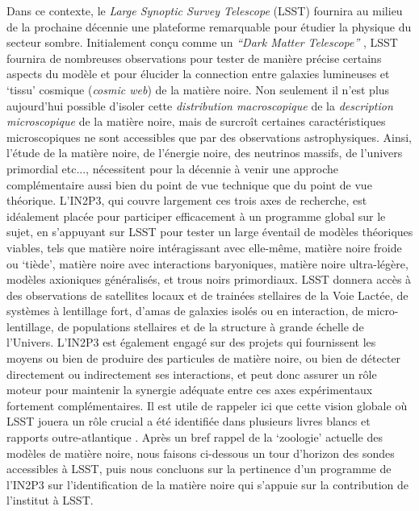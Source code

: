 \documentclass[12pt]{article}
\begin{document}
Dans ce contexte, le {\it Large Synoptic Survey Telescope} (LSST) fournira au milieu de la prochaine décennie une plateforme remarquable pour étudier la physique du secteur sombre. Initialement conçu comme un {\it ``Dark Matter Telescope''} \citep{Tyson:2001}, LSST fournira de nombreuses observations pour tester de manière précise certains aspects du modèle \LCDM et pour élucider la connection entre galaxies lumineuses et `tissu' cosmique ({\it cosmic web}) de la matière noire. Non seulement il n'est plus aujourd'hui possible d'isoler cette \emph{distribution macroscopique} de la \emph{description microscopique} de la matière noire, mais de surcroît certaines caractéristiques microscopiques ne sont accessibles que par des observations astrophysiques. 
Ainsi, l'étude de la matière noire, de l'énergie noire, des neutrinos massifs, de l'univers primordial etc..., nécessitent pour la décennie à venir une approche complémentaire aussi bien du point de vue technique que du point de vue théorique. L'IN2P3, qui couvre largement ces trois axes de recherche, est idéalement placée pour participer efficacement à un programme global sur le sujet, en s'appuyant sur LSST pour tester un large éventail de modèles théoriques viables, tels que matière noire intéragissant avec elle-même, matière noire froide ou `tiède', matière noire avec interactions baryoniques, matière noire ultra-légère, modèles axioniques généralisés, et trous noirs primordiaux. LSST donnera accès à des observations de satellites locaux et de trainées stellaires de la Voie Lactée, de systèmes à lentillage fort, d'amas de galaxies isolés ou en interaction, de micro-lentillage, de populations stellaires et de la structure à grande échelle de l'Univers. L'IN2P3 est également engagé sur des projets qui fournissent les moyens ou bien de produire des particules de matière noire, ou bien de détecter directement ou indirectement ses interactions, et peut donc assurer un rôle moteur pour maintenir la synergie adéquate entre ces axes expérimentaux fortement complémentaires. Il est utile de rappeler ici que cette vision globale où LSST jouera un rôle crucial a été identifiée dans plusieurs livres blancs et rapports outre-atlantique \citep{Astro2010,1310.8642, 1310.5662, 1305.1605,P5Report,1604.07626,1802.07216,Battaglieri:2017aum}. Après un bref rappel de la `zoologie' actuelle des modèles de matière noire, nous faisons ci-dessous un tour d'horizon des sondes accessibles à LSST, puis nous concluons sur la pertinence d'un programme de l'IN2P3 sur l'identification de la matière noire qui s'appuie sur la contribution de l'institut à LSST.
\end{document}
